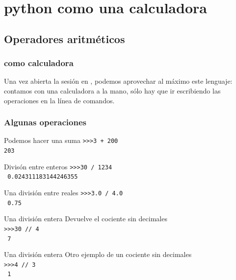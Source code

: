 {\section{python como una calculadora}
\subsection{Operadores aritméticos}
\begin{frame}
\frametitle{\python{} como calculadora}
Una vez abierta la sesión en \python, podemos aprovechar al máximo este lenguaje: contamos con una calculadora a la mano, sólo hay que ir escribiendo las operaciones en la línea de comandos.
\end{frame}
\begin{frame}[fragile]
\frametitle{Algunas operaciones}
\begin{block}{Podemos hacer una suma}
\verb|>>>3 + 200| \\
\pause
\verb|203|
\end{block}
\end{frame}
\begin{frame}[fragile]
\begin{block}{Divisón entre enteros}
\verb|>>>30 / 1234| \\
\pause
\verb| 0.024311183144246355|
\end{block}
\end{frame}
\begin{frame}[fragile]
\begin{block}{Una división entre reales}
\verb|>>>3.0 / 4.0| \\
\pause
\verb| 0.75|
\end{block}
\end{frame}
\begin{frame}[fragile]
\begin{block}{Una división entera}
Devuelve el cociente sin decimales \\
\verb|>>>30 // 4| \\
\pause
\verb| 7|
\end{block}
\end{frame}
\begin{frame}[fragile]
\begin{block}{Una división entera}
Otro ejemplo de un cociente sin decimales \\
\verb|>>>4 // 3| \\
\pause
\verb| 1|
\end{block}

\end{frame}}
